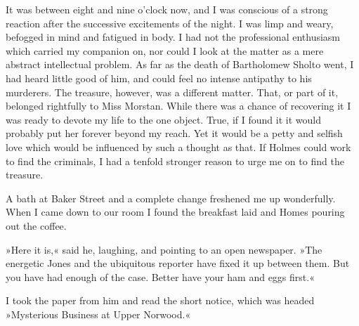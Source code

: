 It was between eight and nine o'clock now, and I was conscious of a strong reaction after the successive excitements of the night. I was limp and weary, befogged in mind and fatigued in body. I had not the professional enthusiasm which carried my companion on, nor could I look at the matter as a mere abstract intellectual problem. As far as the death of Bartholomew Sholto went, I had heard little good of him, and could feel no intense antipathy to his murderers. The treasure, however, was a different matter. That, or part of it, belonged rightfully to Miss Morstan. While there was a chance of recovering it I was ready to devote my life to the one object. True, if I found it it would probably put her forever beyond my reach. Yet it would be a petty and selfish love which would be influenced by such a thought as that. If Holmes could work to find the criminals, I had a tenfold stronger reason to urge me on to find the treasure.

A bath at Baker Street and a complete change freshened me up wonderfully. When I came down to our room I found the breakfast laid and Homes pouring out the coffee.

»Here it is,« said he, laughing, and pointing to an open newspaper. »The energetic Jones and the ubiquitous reporter have fixed it up between them. But you have had enough of the case. Better have your ham and eggs first.«

I took the paper from him and read the short notice, which was headed »Mysterious Business at Upper Norwood.«

